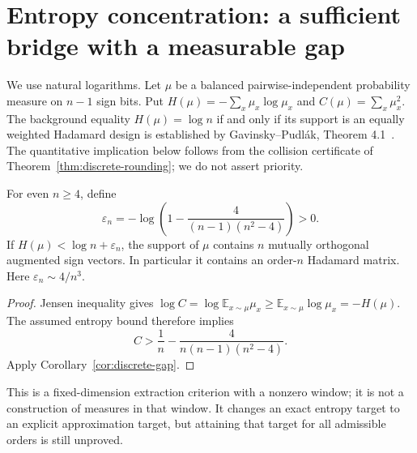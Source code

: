 \section{Entropy concentration: a sufficient bridge with a measurable gap}
\label{sec:entropy-bridge}
We use natural logarithms. Let $\mu$ be a balanced pairwise-independent
probability measure on $n-1$ sign bits. Put
$H(\mu)=-\sum_x\mu_x\log\mu_x$ and $C(\mu)=\sum_x\mu_x^2$.
The background equality $H(\mu)=\log n$ if and only if its support
is an equally weighted Hadamard design is established by
Gavinsky--Pudl\'ak, Theorem 4.1~\cite{GP}. The quantitative implication
below follows from the collision certificate of
Theorem~\ref{thm:discrete-rounding}; we do not assert priority.

\begin{corollary}\label{cor:entropy-window}
For even $n\ge4$, define
\[
 \varepsilon_n=-\log\left(1-\frac4{(n-1)(n^2-4)}\right)>0.
\]
If $H(\mu)<\log n+\varepsilon_n$, the support of $\mu$ contains
$n$ mutually orthogonal augmented sign vectors. In particular it
contains an order-$n$ Hadamard matrix. Here
$\varepsilon_n\sim4/n^3$.
\end{corollary}
\begin{proof}
Jensen inequality gives
$\log C=\log\mathbb E_{x\sim\mu}\mu_x
\ge\mathbb E_{x\sim\mu}\log\mu_x=-H(\mu)$.
The assumed entropy bound therefore implies
\[
 C>\frac1n-\frac4{n(n-1)(n^2-4)}.
\]
Apply Corollary~\ref{cor:discrete-gap}.
\end{proof}
This is a fixed-dimension extraction criterion with a nonzero window;
it is not a construction of measures in that window. It changes an
exact entropy target to an explicit approximation target, but attaining
that target for all admissible orders is still unproved.

